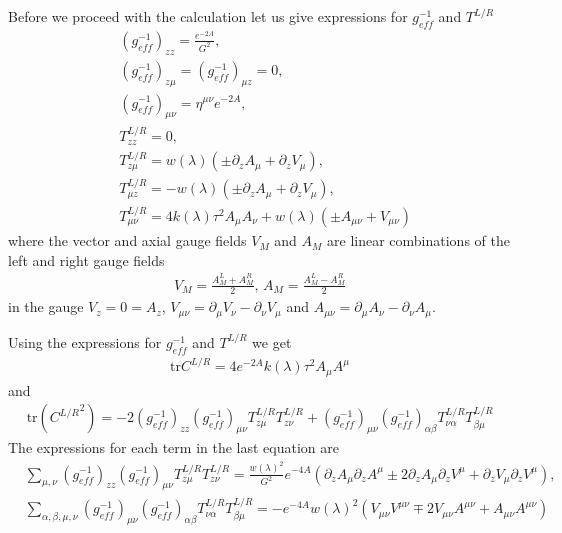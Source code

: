 \documentclass[10 pt]{article}
\begin{document}
Before we proceed with the calculation let us give expressions for $g^{-1}_{eff}$ and $T^{L/R}$
\begin{align}
&\left(g^{-1}_{eff}\right)_{zz} = \frac{e^{-2A}}{G^2}, \\
&\left(g^{-1}_{eff}\right)_{z\mu} = \left(g^{-1}_{eff}\right)_{\mu z} = 0, \\
&\left(g^{-1}_{eff}\right)_{\mu \nu} = \eta^{\mu \nu} e^{-2A}, \\
& T^{L/R}_{zz} = 0, \\
& T^{L/R}_{z \mu} =  w\left(\lambda \right) \left(  \pm \partial_z A_\mu + \partial_z V_\mu \right), \\
& T^{L/R}_{\mu z} = -  w\left(\lambda \right) \left(  \pm \partial_z A_\mu + \partial_z V_\mu \right), \\
& T^{L/R}_{\mu \nu} = 4 k\left(\lambda\right) \tau^2 A_\mu A_\nu + w\left(\lambda \right) \left( \pm A_{\mu \nu} + V_{\mu \nu} \right)
\end{align}
where the vector and axial gauge fields $V_M$ and $A_M$ are linear combinations of the left and right gauge fields
\begin{align}
V_M = \frac{A^L_M + A^R_M}{2}, \, A_M = \frac{A^L_M - A^R_M}{2}
\end{align}
in the gauge $V_z = 0 = A_z$, $V_{\mu \nu} = \partial_\mu V_\nu  - \partial_\nu V_\mu$ and $A_{\mu \nu} = \partial_\mu A_\nu  - \partial_\nu A_\mu$.

Using the expressions for $g^{-1}_{eff}$ and $T^{L/R}$ we get
\begin{align}
\text{tr} C^{L/R} = 4 e^{-2A} k \left( \lambda \right) \tau^2 A_\mu A^\mu
\end{align}
and
\begin{align}
\text{tr} \left( {C^{L/R}}^2\right) = - 2 \left( g^{-1}_{eff} \right)_{zz} \left( g^{-1}_{eff} \right)_{\mu \nu} T^{L/R}_{z \mu} T^{L/R}_{z \nu} +  \left( g^{-1}_{eff} \right)_{\mu \nu} \left( g^{-1}_{eff} \right)_{\alpha \beta} T^{L/R}_{\nu \alpha} T^{L/R}_{\beta \mu} 
\end{align}
The expressions for each term in the last equation are
\begin{align}
&\sum_{\mu, \nu} \left( g^{-1}_{eff} \right)_{zz} \left( g^{-1}_{eff} \right)_{\mu \nu} T^{L/R}_{z \mu} T^{L/R}_{z \nu} = \frac{{w\left(\lambda\right)}^2}{G^2} e^{-4 A} \left( \partial_z A_\mu \partial_z A^\mu \pm 2 \partial_z A_\mu \partial_z V^\mu + \partial_z V_\mu \partial_z V^\mu \right) , \\
& \sum_{\alpha, \beta, \mu, \nu} \left( g^{-1}_{eff} \right)_{\mu \nu} \left( g^{-1}_{eff} \right)_{\alpha \beta} T^{L/R}_{\nu \alpha} T^{L/R}_{\beta \mu} = - e^{-4A} {w\left(\lambda\right)}^2 \left( V_{\mu \nu} V^{\mu \nu} \mp 2 V_{\mu \nu} A^{\mu \nu} + A_{\mu \nu} A^{\mu \nu} \right)
\end{align}
\end{document}
